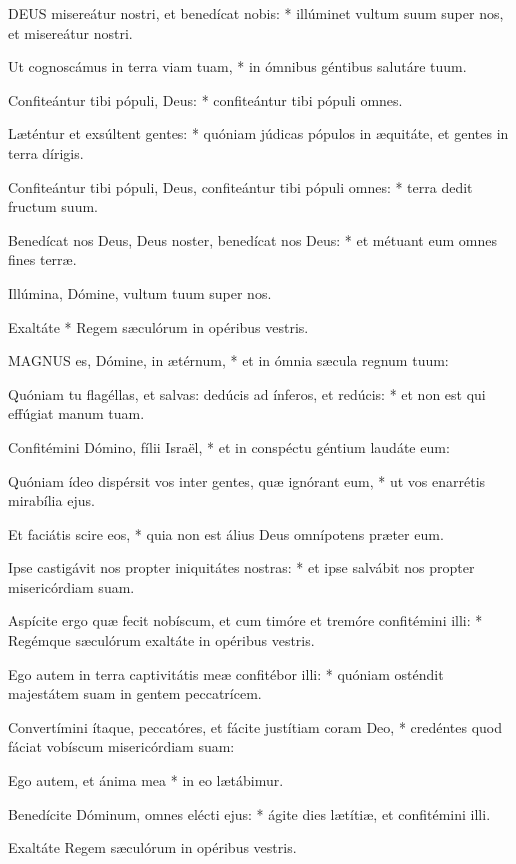 \lettrine[lines=2]{D}{EUS} misereátur nostri, et benedícat nobis: * illúminet vultum suum super nos, et misereátur nostri.

Ut cognoscámus in terra viam tuam, * in ómnibus géntibus salutáre tuum.

Confiteántur tibi pópuli, Deus: * confiteántur tibi pópuli omnes.

Læténtur et exsúltent gentes: * quóniam júdicas pópulos in æquitáte, et gentes in terra dírigis.

Confiteántur tibi pópuli, Deus, confiteántur tibi pópuli omnes: * terra dedit fructum suum.

Benedícat nos Deus, Deus noster, benedícat nos Deus: * et métuant eum omnes fines terræ.

 Illúmina, Dómine, vultum tuum super nos.

 Exaltáte * Regem sæculórum in opéribus vestris.


\lettrine[lines=2]{M}{AGNUS} es, Dómine, in ætérnum, * et in ómnia sæcula regnum tuum:

Quóniam tu flagéllas, et salvas: dedúcis ad ínferos, et redúcis: * et non est qui effúgiat manum tuam.

Confitémini Dómino, fílii Israël, * et in conspéctu géntium laudáte eum:

Quóniam ídeo dispérsit vos inter gentes, quæ ignórant eum, * ut vos enarrétis mirabília ejus.

Et faciátis scire eos, * quia non est álius Deus omnípotens præter eum.

Ipse castigávit nos propter iniquitátes nostras: * et ipse salvábit nos propter misericórdiam suam.

Aspícite ergo quæ fecit nobíscum, et cum timóre et tremóre confitémini illi: * Regémque sæculórum exaltáte in opéribus vestris.

Ego autem in terra captivitátis meæ confitébor illi: * quóniam osténdit majestátem suam in gentem peccatrícem.

Convertímini ítaque, peccatóres, et fácite justítiam coram Deo, * credéntes quod fáciat vobíscum misericórdiam suam:

Ego autem, et ánima mea * in eo lætábimur.

Benedícite Dóminum, omnes elécti ejus: * ágite dies lætítiæ, et confitémini illi.

 Exaltáte Regem sæculórum in opéribus vestris.

